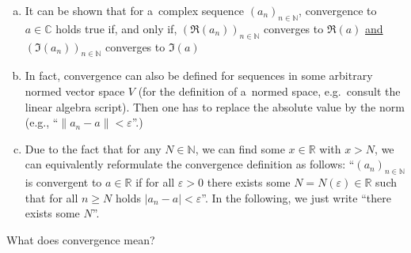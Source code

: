 \begin{Remark}{}
\begin{enumerate}[(a)]
\item It can be shown that for a~complex sequence $(a_n)_{n\in\mathbb{N}}$, convergence to $a\in\mathbb{C}$ holds true if, and only if, $(\Re(a_n))_{n\in\mathbb{N}}$ converges to $\Re(a)$ \underline{and} $(\Im(a_n))_{n\in\mathbb{N}}$ converges to $\Im(a)$
\item In fact, convergence can also be defined for sequences in some arbitrary normed vector space $V$ (for the definition of a~normed space, e.g.\ consult the linear algebra script). Then one has to replace the absolute value by the norm (e.g., ``$\|a_n-a\|<\varepsilon$''.)
\item Due to the fact that for any $N\in\mathbb{N}$, we can find some $x\in\mathbb{R}$ with $x>N$, we can equivalently reformulate the convergence definition as follows:
``$(a_n)_{n\in\mathbb{N}}$ is convergent to $a\in \mathbb{R}$ if for all $\varepsilon>0$ there exists some $N=N(\varepsilon)\in\mathbb{R}$ such that for all $n\geq N$ holds $|a_n-a|<\varepsilon$''. In the following, we just write ``there exists some $N$''.
\end{enumerate}
\end{Remark}

What does convergence mean?



